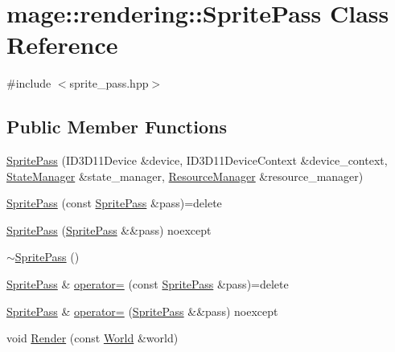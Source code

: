 \hypertarget{classmage_1_1rendering_1_1_sprite_pass}{}\section{mage\+:\+:rendering\+:\+:Sprite\+Pass Class Reference}
\label{classmage_1_1rendering_1_1_sprite_pass}


{\ttfamily \#include $<$sprite\+\_\+pass.\+hpp$>$}

\subsection*{Public Member Functions}
\begin{DoxyCompactItemize}
\item 
\mbox{\hyperlink{classmage_1_1rendering_1_1_sprite_pass_ae247bfa4b2b13a874e080d53e271e974}{Sprite\+Pass}} (I\+D3\+D11\+Device \&device, I\+D3\+D11\+Device\+Context \&device\+\_\+context, \mbox{\hyperlink{classmage_1_1rendering_1_1_state_manager}{State\+Manager}} \&state\+\_\+manager, \mbox{\hyperlink{classmage_1_1rendering_1_1_resource_manager}{Resource\+Manager}} \&resource\+\_\+manager)
\item 
\mbox{\hyperlink{classmage_1_1rendering_1_1_sprite_pass_a9352291e5364fc157e4b2a1cd1184d8d}{Sprite\+Pass}} (const \mbox{\hyperlink{classmage_1_1rendering_1_1_sprite_pass}{Sprite\+Pass}} \&pass)=delete
\item 
\mbox{\hyperlink{classmage_1_1rendering_1_1_sprite_pass_ae8b938a091647c5540fa2ca8bf955556}{Sprite\+Pass}} (\mbox{\hyperlink{classmage_1_1rendering_1_1_sprite_pass}{Sprite\+Pass}} \&\&pass) noexcept
\item 
\mbox{\hyperlink{classmage_1_1rendering_1_1_sprite_pass_ac838dec1c351d3d4f0fdcc38ef98dc1f}{$\sim$\+Sprite\+Pass}} ()
\item 
\mbox{\hyperlink{classmage_1_1rendering_1_1_sprite_pass}{Sprite\+Pass}} \& \mbox{\hyperlink{classmage_1_1rendering_1_1_sprite_pass_a33cd3abf007bafb47d76524096e24eca}{operator=}} (const \mbox{\hyperlink{classmage_1_1rendering_1_1_sprite_pass}{Sprite\+Pass}} \&pass)=delete
\item 
\mbox{\hyperlink{classmage_1_1rendering_1_1_sprite_pass}{Sprite\+Pass}} \& \mbox{\hyperlink{classmage_1_1rendering_1_1_sprite_pass_a17566d8f281862629f095211bad18b9e}{operator=}} (\mbox{\hyperlink{classmage_1_1rendering_1_1_sprite_pass}{Sprite\+Pass}} \&\&pass) noexcept
\item 
void \mbox{\hyperlink{classmage_1_1rendering_1_1_sprite_pass_a9b4dbd8c8d0a8942976b6d0c0df7aa3d}{Render}} (const \mbox{\hyperlink{classmage_1_1rendering_1_1_world}{World}} \&world)
\end{DoxyCompactItemize}
